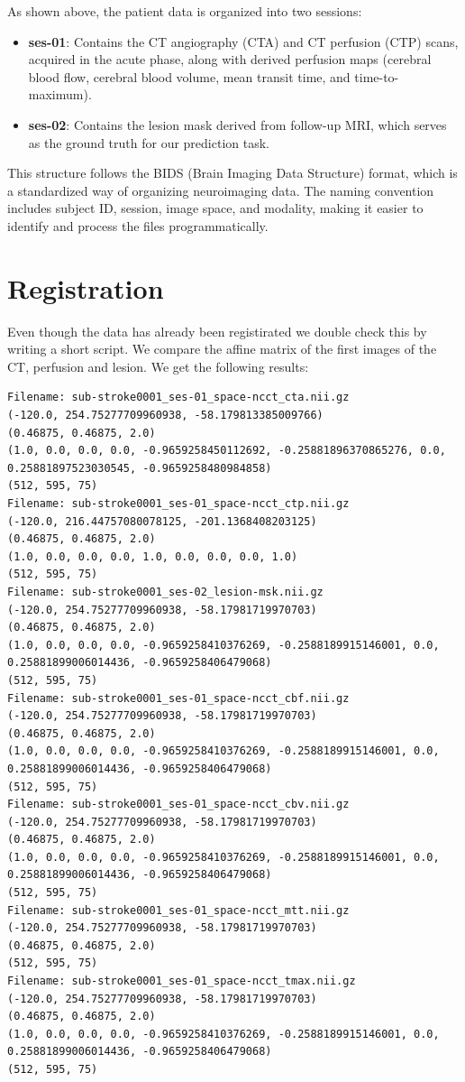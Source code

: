As shown above, the patient data is organized into two sessions:
\begin{itemize}
    \item \textbf{ses-01}: Contains the CT angiography (CTA) and CT perfusion (CTP) scans, acquired in the acute phase, along with derived perfusion maps (cerebral blood flow, cerebral blood volume, mean transit time, and time-to-maximum).
    \item \textbf{ses-02}: Contains the lesion mask derived from follow-up MRI, which serves as the ground truth for our prediction task.
\end{itemize}

This structure follows the BIDS (Brain Imaging Data Structure) format, which is a standardized way of organizing neuroimaging data. The naming convention includes subject ID, session, image space, and modality, making it easier to identify and process the files programmatically.

\section{Registration}
\label{sec:registration}
Even though the data has already been registirated we double check this by writing a short script. 
We compare the affine matrix of the first images of the CT, perfusion and lesion. 
We get the following results:

\begin{verbatim}
Filename: sub-stroke0001_ses-01_space-ncct_cta.nii.gz
(-120.0, 254.75277709960938, -58.179813385009766)
(0.46875, 0.46875, 2.0)
(1.0, 0.0, 0.0, 0.0, -0.9659258450112692, -0.25881896370865276, 0.0, 0.25881897523030545, -0.9659258480984858)
(512, 595, 75)
Filename: sub-stroke0001_ses-01_space-ncct_ctp.nii.gz
(-120.0, 216.44757080078125, -201.1368408203125)
(0.46875, 0.46875, 2.0)
(1.0, 0.0, 0.0, 0.0, 1.0, 0.0, 0.0, 0.0, 1.0)
(512, 595, 75)
Filename: sub-stroke0001_ses-02_lesion-msk.nii.gz
(-120.0, 254.75277709960938, -58.17981719970703)
(0.46875, 0.46875, 2.0)
(1.0, 0.0, 0.0, 0.0, -0.9659258410376269, -0.2588189915146001, 0.0, 0.25881899006014436, -0.9659258406479068)
(512, 595, 75)
Filename: sub-stroke0001_ses-01_space-ncct_cbf.nii.gz
(-120.0, 254.75277709960938, -58.17981719970703)
(0.46875, 0.46875, 2.0)
(1.0, 0.0, 0.0, 0.0, -0.9659258410376269, -0.2588189915146001, 0.0, 0.25881899006014436, -0.9659258406479068)
(512, 595, 75)
Filename: sub-stroke0001_ses-01_space-ncct_cbv.nii.gz
(-120.0, 254.75277709960938, -58.17981719970703)
(0.46875, 0.46875, 2.0)
(1.0, 0.0, 0.0, 0.0, -0.9659258410376269, -0.2588189915146001, 0.0, 0.25881899006014436, -0.9659258406479068)
(512, 595, 75)
Filename: sub-stroke0001_ses-01_space-ncct_mtt.nii.gz
(-120.0, 254.75277709960938, -58.17981719970703)
(0.46875, 0.46875, 2.0)
(512, 595, 75)
Filename: sub-stroke0001_ses-01_space-ncct_tmax.nii.gz
(-120.0, 254.75277709960938, -58.17981719970703)
(0.46875, 0.46875, 2.0)
(1.0, 0.0, 0.0, 0.0, -0.9659258410376269, -0.2588189915146001, 0.0, 0.25881899006014436, -0.9659258406479068)
(512, 595, 75)
\end{verbatim}

